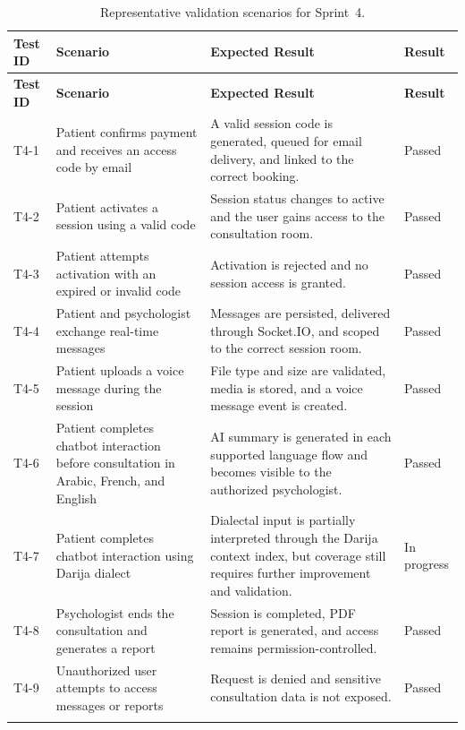 \documentclass[a4paper,12pt]{report}
\begin{document}
\begin{longtable}{@{} L{0.11\textwidth} L{0.48\textwidth} L{0.23\textwidth} C{0.12\textwidth} @{}}
\toprule
\textbf{Test ID} &
\textbf{Scenario} &
\textbf{Expected Result} &
\textbf{Result} \\
\midrule
\endfirsthead

\toprule
\textbf{Test ID} &
\textbf{Scenario} &
\textbf{Expected Result} &
\textbf{Result} \\
\midrule
\endhead

T4-1 & Patient confirms payment and receives an access code by email & A valid session code is generated, queued for email delivery, and linked to the correct booking. & \textcolor{successgreen}{Passed} \\
\midrule
T4-2 & Patient activates a session using a valid code & Session status changes to active and the user gains access to the consultation room. & \textcolor{successgreen}{Passed} \\
\midrule
T4-3 & Patient attempts activation with an expired or invalid code & Activation is rejected and no session access is granted. & \textcolor{successgreen}{Passed} \\
\midrule
T4-4 & Patient and psychologist exchange real-time messages & Messages are persisted, delivered through Socket.IO, and scoped to the correct session room. & \textcolor{successgreen}{Passed} \\
\midrule
T4-5 & Patient uploads a voice message during the session & File type and size are validated, media is stored, and a voice message event is created. & \textcolor{successgreen}{Passed} \\
\midrule
T4-6 & Patient completes chatbot interaction before consultation in Arabic, French, and English & AI summary is generated in each supported language flow and becomes visible to the authorized psychologist. & \textcolor{successgreen}{Passed} \\
\midrule
T4-7 & Patient completes chatbot interaction using Darija dialect & Dialectal input is partially interpreted through the Darija context index, but coverage still requires further improvement and validation. & \textcolor{warnorange}{In progress} \\
\midrule
T4-8 & Psychologist ends the consultation and generates a report & Session is completed, PDF report is generated, and access remains permission-controlled. & \textcolor{successgreen}{Passed} \\
\midrule
T4-9 & Unauthorized user attempts to access messages or reports & Request is denied and sensitive consultation data is not exposed. & \textcolor{successgreen}{Passed} \\
\bottomrule
\caption{Representative validation scenarios for Sprint~4.}
\label{tab:sprint4-tests}\\
\end{longtable}
\end{document}
